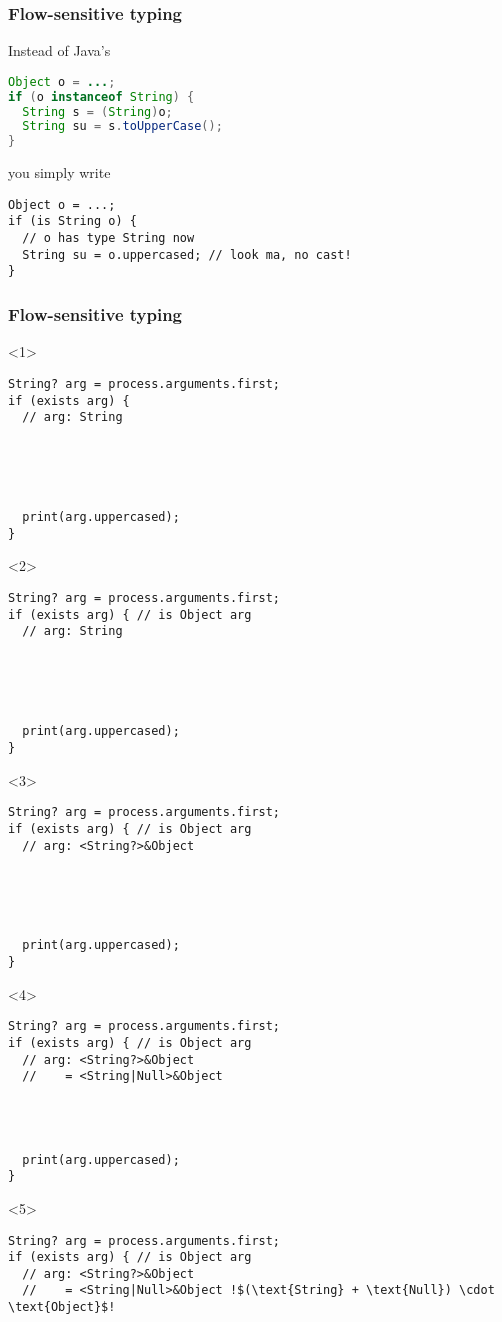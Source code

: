 \documentclass[aspectratio=169]{beamer}
\begin{document}
\begin{frame}[fragile]
  \frametitle{Flow-sensitive typing}
  Instead of Java’s
  \begin{lstlisting}[language=java]
Object o = ...;
if (o instanceof String) {
  String s = (String)o;
  String su = s.toUpperCase();
}
  \end{lstlisting}
  \pause
  you simply write
  \begin{lstlisting}
Object o = ...;
if (is String o) {
  // o has type String now
  String su = o.uppercased; // look ma, no cast!
}
  \end{lstlisting}
\end{frame}

\begin{frame}[fragile]
  \frametitle{Flow-sensitive typing}
  \begin{onlyenv}<1>
    \begin{lstlisting}
String? arg = process.arguments.first;
if (exists arg) {
  // arg: String





  print(arg.uppercased);
}
    \end{lstlisting}
  \end{onlyenv}
  \begin{onlyenv}<2>
    \begin{lstlisting}
String? arg = process.arguments.first;
if (exists arg) { // is Object arg
  // arg: String





  print(arg.uppercased);
}
    \end{lstlisting}
  \end{onlyenv}
  \begin{onlyenv}<3>
    \begin{lstlisting}
String? arg = process.arguments.first;
if (exists arg) { // is Object arg
  // arg: <String?>&Object





  print(arg.uppercased);
}
    \end{lstlisting}
  \end{onlyenv}
  \begin{onlyenv}<4>
    \begin{lstlisting}
String? arg = process.arguments.first;
if (exists arg) { // is Object arg
  // arg: <String?>&Object
  //    = <String|Null>&Object




  print(arg.uppercased);
}
    \end{lstlisting}
  \end{onlyenv}
  \begin{onlyenv}<5>
    \begin{lstlisting}[escapechar=!]
String? arg = process.arguments.first;
if (exists arg) { // is Object arg
  // arg: <String?>&Object
  //    = <String|Null>&Object !$(\text{String} + \text{Null}) \cdot \text{Object}$!





\end{lstlisting}
\end{onlyenv}
\end{frame}
\end{document}
